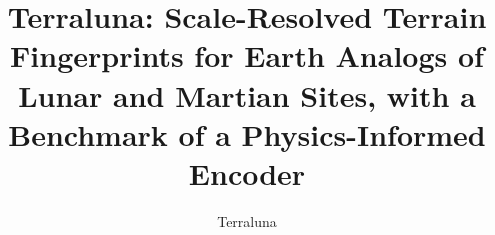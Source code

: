 \documentclass[11pt]{article}
\title{Terraluna: Scale-Resolved Terrain Fingerprints for Earth Analogs of Lunar and Martian Sites, with a Benchmark of a Physics-Informed Encoder}
\author{Terraluna}
\date{}
\begin{document}
\maketitle

\begin{abstract}

\end{abstract}















\appendix


\end{document}
